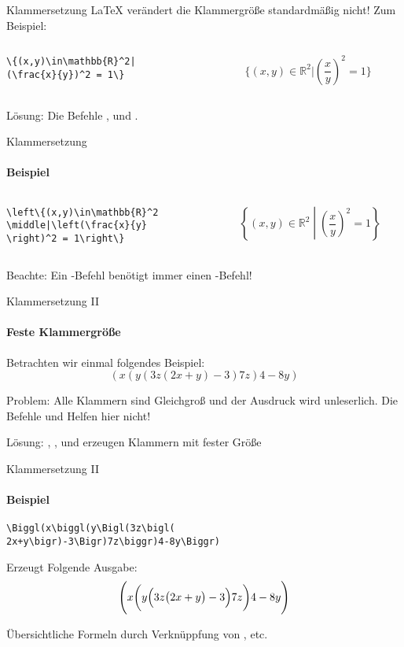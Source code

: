 \begin{frame}[fragile]{Klammersetzung}
\LaTeX{} verändert die Klammergröße standardmäßig \alert{nicht}! Zum Beispiel: 
\begin{columns}
\begin{column}{0.55\textwidth}
\begin{codeblock}
\begin{verbatim}
\{(x,y)\in\mathbb{R}^2|
(\frac{x}{y})^2 = 1\}
\end{verbatim}
\end{codeblock}
\end{column}
\begin{column}{0.35\textwidth}
\[
    \{(x,y)\in\mathbb{R}^2|(\frac{x}{y})^2 = 1\}
\]
\end{column}
\end{columns}

\medskip\pause
Lösung: Die Befehle ,  und .
\end{frame}

\begin{frame}[fragile]{Klammersetzung}
\framesubtitle{Beispiel}
\begin{columns}
\begin{column}{0.55\textwidth}
\begin{codeblock}
\begin{verbatim}
\left\{(x,y)\in\mathbb{R}^2
\middle|\left(\frac{x}{y}
\right)^2 = 1\right\}
\end{verbatim}
\end{codeblock}
\end{column}
\begin{column}{0.35\textwidth}
\[
    \left\{(x,y)\in\mathbb{R}^2\middle|\left(\frac{x}{y}\right)^2 = 1\right\}
\]
\end{column}
\end{columns}
\medskip\pause
Beachte: \alert{Ein -Befehl benötigt immer einen -Befehl!}
\end{frame}

\begin{frame}[fragile]{Klammersetzung II}
\framesubtitle{Feste Klammergröße}
Betrachten wir einmal folgendes Beispiel:
\[
    (x(y(3z(2x+y)-3)7z)4-8y)
\]

\medskip\pause
Problem: Alle Klammern sind Gleichgroß und der Ausdruck wird unleserlich. Die Befehle  und  Helfen hier nicht!

\medskip\pause
Lösung: , ,  und  erzeugen Klammern mit fester Größe
\end{frame}

\begin{frame}[fragile]{Klammersetzung II}
\framesubtitle{Beispiel}
\begin{codeblock}
\begin{verbatim}
\Biggl(x\biggl(y\Bigl(3z\bigl(
2x+y\bigr)-3\Bigr)7z\biggr)4-8y\Biggr)
\end{verbatim}
\end{codeblock}
Erzeugt Folgende Ausgabe: 
\[
    \Biggl(x\biggl(y\Bigl(3z\bigl(2x+y\bigr)-3\Bigr)7z\biggr)4-8y\Biggr)
\]\pause

Übersichtliche Formeln durch Verknüppfung von ,  etc.
\end{frame}